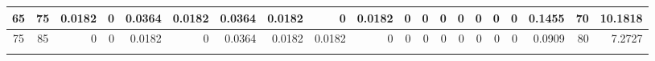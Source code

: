 \begin{table}[ht]
\begin{adjustbox}{width = \textwidth, center}
\begin{tabular}{|cc|r|r|r|r|r|r|r|r|r|r|r|r|r|r|r|rrr|}
        \cellcolor[HTML]{C9DAF8}65             & \cellcolor[HTML]{EBF1FC}75             & \cellcolor[HTML]{DEF2E8}0.0182                 & \cellcolor[HTML]{FFFFFF}0                      & \cellcolor[HTML]{BCE4D1}0.0364                 & \cellcolor[HTML]{DEF2E8}0.0182                 & \cellcolor[HTML]{BCE4D1}0.0364                 & \cellcolor[HTML]{DEF2E8}0.0182                 & \cellcolor[HTML]{FFFFFF}0                      & \cellcolor[HTML]{DEF2E8}0.0182                  & \cellcolor[HTML]{FFFFFF}0                       & \cellcolor[HTML]{FFFFFF}0                       & \cellcolor[HTML]{FFFFFF}0                       & \cellcolor[HTML]{FFFFFF}0                       & \cellcolor[HTML]{FFFFFF}0                       & \cellcolor[HTML]{FFFFFF}0                       & \cellcolor[HTML]{FFFFFF}0                       & \multicolumn{1}{r|}{\cellcolor[HTML]{D9D2E9}0.1455}                             & \multicolumn{1}{r|}{\cellcolor[HTML]{D9D2E9}70}                         & \cellcolor[HTML]{D9D2E9}10.1818                                                                  \\ \hline
        \rowcolor[HTML]{FFFFFF} 
        \cellcolor[HTML]{C9DAF8}75             & \cellcolor[HTML]{EBF1FC}85             & 0                                              & 0                                              & \cellcolor[HTML]{DEF2E8}0.0182                 & 0                                              & \cellcolor[HTML]{BCE4D1}0.0364                 & \cellcolor[HTML]{DEF2E8}0.0182                 & \cellcolor[HTML]{DEF2E8}0.0182                 & 0                                               & 0                                               & 0                                               & 0                                               & 0                                               & 0                                               & 0                                               & 0                                               & \multicolumn{1}{r|}{\cellcolor[HTML]{D9D2E9}0.0909}                             & \multicolumn{1}{r|}{\cellcolor[HTML]{D9D2E9}80}                         & \cellcolor[HTML]{D9D2E9}7.2727                                                                   \\ \hline
        \rowcolor[HTML]{FFFFFF} 

\end{tabular}
\end{adjustbox}
\end{table}
